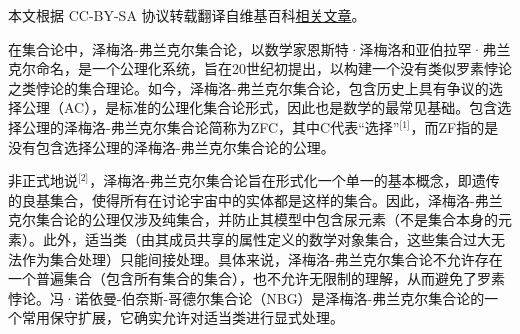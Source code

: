 
本文根据 CC-BY-SA 协议转载翻译自维基百科\href{https://en.wikipedia.org/wiki/Zermelo\%E2\%80\%93Fraenkel_set_theory}{相关文章}。

在集合论中，泽梅洛-弗兰克尔集合论，以数学家恩斯特·泽梅洛和亚伯拉罕·弗兰克尔命名，是一个公理化系统，旨在20世纪初提出，以构建一个没有类似罗素悖论之类悖论的集合理论。如今，泽梅洛-弗兰克尔集合论，包含历史上具有争议的选择公理（AC），是标准的公理化集合论形式，因此也是数学的最常见基础。包含选择公理的泽梅洛-弗兰克尔集合论简称为ZFC，其中C代表“选择”\(^\text{[1]}\)，而ZF指的是没有包含选择公理的泽梅洛-弗兰克尔集合论的公理。

非正式地说\(^\text{[2]}\)，泽梅洛-弗兰克尔集合论旨在形式化一个单一的基本概念，即遗传的良基集合，使得所有在讨论宇宙中的实体都是这样的集合。因此，泽梅洛-弗兰克尔集合论的公理仅涉及纯集合，并防止其模型中包含尿元素（不是集合本身的元素）。此外，适当类（由其成员共享的属性定义的数学对象集合，这些集合过大无法作为集合处理）只能间接处理。具体来说，泽梅洛-弗兰克尔集合论不允许存在一个普遍集合（包含所有集合的集合），也不允许无限制的理解，从而避免了罗素悖论。冯·诺依曼-伯奈斯-哥德尔集合论（NBG）是泽梅洛-弗兰克尔集合论的一个常用保守扩展，它确实允许对适当类进行显式处理。

